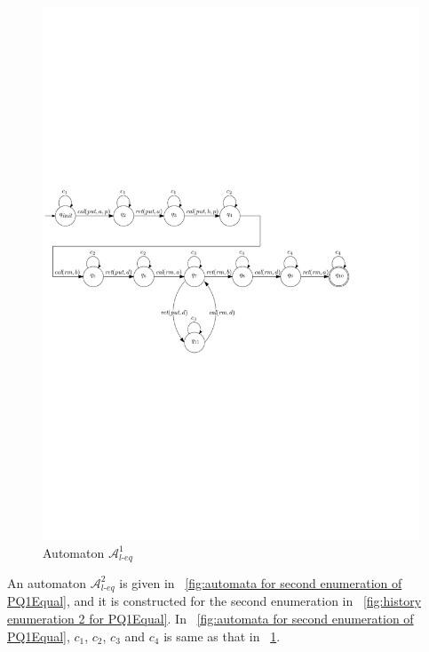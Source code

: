 \begin{figure}[htbp]
  \centering
  \includegraphics[width=0.8 \textwidth]{figures/PIC_AUTO_PQ1Equ-1.pdf}
  \caption{Automaton $\mathcal{A}_{\textit{l-eq}}^1$}
  \label{fig:automata for first enumeration of PQ1Equal}
\end{figure}


An automaton $\mathcal{A}_{\textit{l-eq}}^2$ is given in \figurename~\ref{fig:automata for second enumeration of PQ1Equal}, and it is constructed for the second enumeration in \figurename~\ref{fig:history enumeration 2 for PQ1Equal}. In \figurename~\ref{fig:automata for second enumeration of PQ1Equal}, $c_1$, $c_2$, $c_3$ and $c_4$ is same as that in \figurename~\ref{fig:automata for first enumeration of PQ1Equal}.


